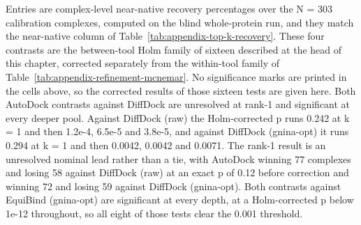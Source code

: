 \begin{longtable}[]
{Entries are complex-level near-native recovery percentages over the N = 303 calibration complexes, computed on the blind whole-protein run, and they match the near-native column of Table~\ref{tab:appendix-top-k-recovery}. These four contrasts are the between-tool Holm family of sixteen described at the head of this chapter, corrected separately from the within-tool family of Table~\ref{tab:appendix-refinement-mcnemar}. No significance marks are printed in the cells above, so the corrected results of those sixteen tests are given here. Both AutoDock contrasts against DiffDock are unresolved at rank-1 and significant at every deeper pool. Against DiffDock (raw) the Holm-corrected p runs 0.242 at k = 1 and then 1.2e-4, 6.5e-5 and 3.8e-5, and against DiffDock (gnina-opt) it runs 0.294 at k = 1 and then 0.0042, 0.0042 and 0.0071. The rank-1 result is an unresolved nominal lead rather than a tie, with AutoDock winning 77 complexes and losing 58 against DiffDock (raw) at an exact p of 0.12 before correction and winning 72 and losing 59 against DiffDock (gnina-opt). Both contrasts against EquiBind (gnina-opt) are significant at every depth, at a Holm-corrected p below 1e-12 throughout, so all eight of those tests clear the 0.001 threshold.} \\
\end{longtable}
\endgroup

